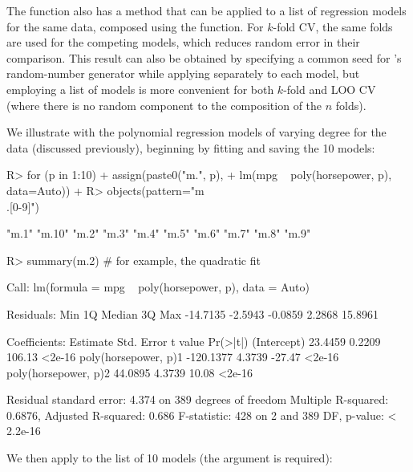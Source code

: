 \documentclass[
]{jss}
\begin{document}
The  function also has a method that can be applied to a list
of regression models for the same data, composed using the
 function. For \(k\)-fold CV, the same folds are used for
the competing models, which reduces random error in their comparison.
This result can also be obtained by specifying a common seed for
's random-number generator while applying 
separately to each model, but employing a list of models is more
convenient for both \(k\)-fold and LOO CV (where there is no random
component to the composition of the \(n\) folds).

We illustrate with the polynomial regression models of varying degree
for the  data (discussed previously), beginning by fitting
and saving the 10 models:

\begin{CodeChunk}
\begin{CodeInput}
R> for (p in 1:10){
+   assign(paste0("m.", p),
+          lm(mpg ~ poly(horsepower, p), data=Auto))
+ }
R> objects(pattern="m\\.[0-9]")
\end{CodeInput}
\begin{CodeOutput}
 [1] "m.1"  "m.10" "m.2"  "m.3"  "m.4"  "m.5"  "m.6"  "m.7"  "m.8"  "m.9" 
\end{CodeOutput}
\begin{CodeInput}
R> summary(m.2) # for example, the quadratic fit
\end{CodeInput}
\begin{CodeOutput}

Call:
lm(formula = mpg ~ poly(horsepower, p), data = Auto)

Residuals:
     Min       1Q   Median       3Q      Max 
-14.7135  -2.5943  -0.0859   2.2868  15.8961 

Coefficients:
                      Estimate Std. Error t value Pr(>|t|)
(Intercept)            23.4459     0.2209  106.13   <2e-16
poly(horsepower, p)1 -120.1377     4.3739  -27.47   <2e-16
poly(horsepower, p)2   44.0895     4.3739   10.08   <2e-16

Residual standard error: 4.374 on 389 degrees of freedom
Multiple R-squared:  0.6876,    Adjusted R-squared:  0.686 
F-statistic:   428 on 2 and 389 DF,  p-value: < 2.2e-16
\end{CodeOutput}
\end{CodeChunk}

We then apply  to the list of 10 models (the 
argument is required):
\end{document}
